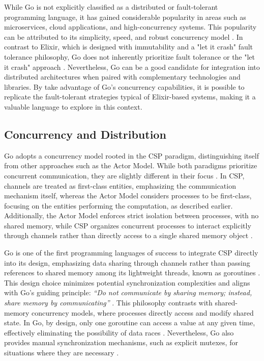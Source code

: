 While Go is not explicitly classified as a distributed or fault-tolerant programming language, it has gained considerable popularity in areas such as microservices, cloud applications, and high-concurrency systems. This popularity can be attributed to its simplicity, speed, and robust concurrency model \cite{Castro2019,Shuiskov2022}. In contrast to Elixir, which is designed with immutability and a "let it crash" fault tolerance philosophy, Go does not inherently prioritize fault tolerance or the "let it crash" approach \cite{Cox-Buday2017}. Nevertheless, Go can be a good candidate for integration into distributed architectures when paired with complementary technologies and libraries. By take advantage of Go’s concurrency capabilities, it is possible to replicate the fault-tolerant strategies typical of Elixir-based systems, making it a valuable language to explore in this context.

\subsection{Concurrency and Distribution}

Go adopts a concurrency model rooted in the \gls{CSP} paradigm, distinguishing itself from other approaches such as the Actor Model. While both paradigms prioritize concurrent communication, they are slightly different in their focus \cite{Cox-Buday2017}. In \gls{CSP}, channels are treated as first-class entities, emphasizing the communication mechanism itself, whereas the Actor Model considers processes to be first-class, focusing on the entities performing the computation, as described earlier. Additionally, the Actor Model enforces strict isolation between processes, with no shared memory, while CSP organizes concurrent processes to interact explicitly through channels rather than directly access to a single shared memory object \cite{Cox-Buday2017}.

Go is one of the first programming languages of success to integrate \gls{CSP} directly into its design, emphasizing data sharing through channels rather than passing references to shared memory among its lightweight threads, known as goroutines \cite{Cox-Buday2017}. This design choice minimizes potential synchronization complexities and aligns with Go’s guiding principle: \textit{“Do not communicate by sharing memory; instead, share memory by communicating”} \cite{go-docs}. This philosophy contrasts with shared-memory concurrency models, where processes directly access and modify shared state. In Go, by design, only one goroutine can access a value at any given time, effectively eliminating the possibility of data races \cite{Kennedy2016,go-docs}. Nevertheless, Go also provides manual synchronization mechanisms, such as explicit mutexes, for situations where they are necessary \cite{Cox-Buday2017}.

